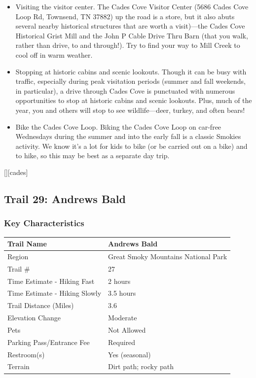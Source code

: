 \documentclass[
  letterpaper,
  DIV=11,
  numbers=noendperiod]{scrartcl}
\providecommand{\tightlist}{%
  \setlength{\itemsep}{0pt}\setlength{\parskip}{0pt}}\usepackage{longtable,booktabs,array}
\begin{document}
\begin{itemize}
\tightlist
\item
  Visiting the visitor center. The Cades Cove Visitor Center (5686 Cades
  Cove Loop Rd, Townsend, TN 37882) up the road is a store, but it also
  abuts several nearby historical structures that are worth a
  visit)---the Cades Cove Historical Grist Mill and the John P Cable
  Drive Thru Barn (that you walk, rather than drive, to and through!).
  Try to find your way to Mill Creek to cool off in warm weather.
\item
  Stopping at historic cabins and scenic lookouts. Though it can be busy
  with traffic, especially during peak visitation periods (summer and
  fall weekends, in particular), a drive through Cades Cove is
  punctuated with numerous opportunities to stop at historic cabins and
  scenic lookouts. Plus, much of the year, you and others will stop to
  see wildlife---deer, turkey, and often bears!
\item
  Bike the Cades Cove Loop. Biking the Cades Cove Loop on car-free
  Wednesdays during the summer and into the early fall is a classic
  Smokies activity. We know it's a lot for kids to bike (or be carried
  out on a bike) and to hike, so this may be best as a separate day
  trip.
\end{itemize}

{[}{]}{[}cades{]}

\hypertarget{trail-29-andrews-bald}{%
\subsection{Trail 29: Andrews Bald}\label{trail-29-andrews-bald}}

\hypertarget{key-characteristics-27}{%
\subsubsection{Key Characteristics}\label{key-characteristics-27}}

\begin{longtable}[]{@{}ll@{}}
\toprule\noalign{}
Trail Name & Andrews Bald \\
\midrule\noalign{}
\endhead
\bottomrule\noalign{}
\endlastfoot
Region & Great Smoky Mountains National Park \\
Trail \# & 27 \\
Time Estimate - Hiking Fast & 2 hours \\
Time Estimate - Hiking Slowly & 3.5 hours \\
Trail Distance (Miles) & 3.6 \\
Elevation Change & Moderate \\
Pets & Not Allowed \\
Parking Pass/Entrance Fee & Required \\
Restroom(s) & Yes (seasonal) \\
Terrain & Dirt path; rocky path \\
\end{longtable}
\end{document}
